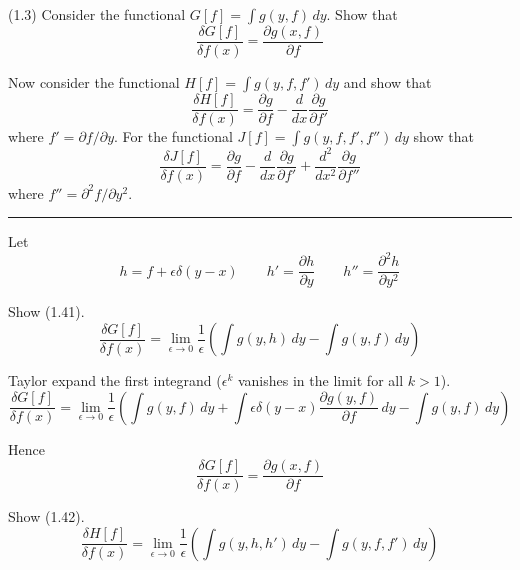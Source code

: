 \documentclass[12pt]{article}
\begin{document}
(1.3)
Consider the functional $G[f]=\int g(y,f)\,dy$.
Show that
\begin{equation*}
\frac{\delta G[f]}{\delta f(x)}=\frac{\partial g(x,f)}{\partial f}
\tag{1.41}
\end{equation*}

Now consider the functional $H[f]=\int g(y,f,f')\,dy$
and show that
\begin{equation*}
\frac{\delta H[f]}{\delta f(x)}=\frac{\partial g}{\partial f}
-\frac{d}{dx}\frac{\partial g}{\partial f'}
\tag{1.42}
\end{equation*}
where $f'=\partial f/\partial y$.
For the functional $J[f]=\int g(y,f,f',f'')\,dy$ show that
\begin{equation*}
\frac{\delta J[f]}{\delta f(x)}
=\frac{\partial g}{\partial f}
-\frac{d}{dx}\frac{\partial g}{\partial f'}
+\frac{d^2}{dx^2}\frac{\partial g}{\partial f''}
\tag{1.43}
\end{equation*}
where $f''=\partial^2 f/\partial y^2$.

\bigskip
\hrule

\bigskip
Let
\begin{equation*}
h=f+\epsilon\delta(y-x)
\qquad
h'=\frac{\partial h}{\partial y}
\qquad
h''=\frac{\partial^2 h}{\partial y^2}
\end{equation*}

Show (1.41).
\begin{equation*}
\frac{\delta G[f]}{\delta f(x)}
=\lim_{\epsilon\rightarrow 0}\frac{1}{\epsilon}
\left(
\int g(y,h)\,dy-\int g(y,f)\,dy
\right)
\end{equation*}

Taylor expand the first integrand ($\epsilon^k$ vanishes in the limit for all $k>1$).
\begin{equation*}
\frac{\delta G[f]}{\delta f(x)}
=\lim_{\epsilon\rightarrow 0}\frac{1}{\epsilon}
\left(
\int g(y,f)\,dy
+\int\epsilon\delta(y-x)\frac{\partial g(y,f)}{\partial f}\,dy
-\int g(y,f)\,dy
\right)
\end{equation*}

Hence
\begin{equation*}
\frac{\delta G[f]}{\delta f(x)}=\frac{\partial g(x,f)}{\partial f}
\end{equation*}

Show (1.42).
\begin{equation*}
\frac{\delta H[f]}{\delta f(x)}
=\lim_{\epsilon\rightarrow 0}\frac{1}{\epsilon}
\left(
\int g(y,h,h')\,dy-\int g(y,f,f')\,dy
\right)
\end{equation*}
\end{document}
